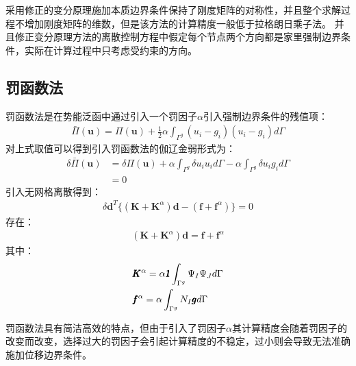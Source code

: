 采用修正的变分原理施加本质边界条件保持了刚度矩阵的对称性，并且整个求解过程不增加刚度矩阵的维数，但是该方法的计算精度一般低于拉格朗日乘子法。
并且修正变分原理方法的离散控制方程中假定每个节点两个方向都是家里强制边界条件，实际在计算过程中只考虑受约束的方向。
\subsection{罚函数法}
罚函数法是在势能泛函中通过引入一个罚因子$\alpha$引入强制边界条件的残值项：
\begin{equation}
\begin{split}
    \bar{\Pi}(\pmb{u})=\Pi(\pmb{u})+\frac{1}{2}\alpha\int_{\Gamma^g}(u_i-g_i)(u_i-g_i)d\Gamma
\end{split}
\end{equation}
对上式取值可以得到引入罚函数法的伽辽金弱形式为：
\begin{equation}
\begin{split}
    \delta\bar{\Pi}(\pmb{u})&=\delta\Pi(\pmb{u})+\alpha\int_{\Gamma^g}\delta u_iu_id\Gamma-\alpha\int_{\Gamma^g}\delta u_ig_id\Gamma\\
    &=0
\end{split}                                                 
\end{equation}
引入无网格离散得到：
\begin{equation}
\begin{split}
      \delta\pmb{d}^T\{(\pmb{K}+\pmb{K}^{\alpha})\pmb{d}-(\pmb{f}+\pmb{f}^{\alpha})\}=0
\end{split}                                                 
\end{equation}
存在：
\begin{equation}
\begin{split}
    (\pmb{K}+\pmb{K}^{\alpha})\pmb{d}=\pmb{f}+\pmb{f}^{\alpha}
\end{split}
\end{equation}
其中：
\begin{equation}
\begin{split}
  &\pmb{K}^{\alpha}=\alpha\pmb{\textsl{1}}\int_{\Gamma^g}\Psi_I\Psi_Jd\Gamma\\
  &\pmb{f}^{\alpha}=\alpha\int_{\Gamma^g}N_I\pmb{g}d\Gamma
\end{split}
\end{equation}\par
罚函数法具有简洁高效的特点，但由于引入了罚因子$\alpha$其计算精度会随着罚因子的改变而改变，选择过大的罚因子会引起计算精度的不稳定，过小则会导致无法准确施加位移边界条件。
